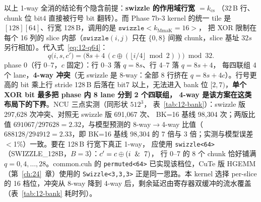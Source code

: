 以上 1-way 全消的结论有个隐含前提：\textbf{swizzle 的作用域行宽 $=k_{\mathrm{cs}}$}
（32\,B 行、chunk 位 bit4 直接被行号 bit 翻转）。而 Phase 7b-3 kernel 的统一 tile
是 $[128][64]$、行宽 128\,B，调用的是 $\texttt{swizzle}<k_{\mathrm{MmaK}}{=}16>$，
把 XOR 限制在每个 16 列的 slice 内部（$\texttt{swizzle}(i,j)$ 只在
$\{0,8\}$ 间搬 chunk，slice 基址 $32s$ 另行相加）。代入式~\ref{eq:12-q64}：
\begin{equation}
  q\bigl(i,s,c'\bigr) = \bigl(8s + 4\,(c\oplus(\lfloor i/4\rfloor\bmod2))\bigr)\bmod 32 .
\end{equation}
phase 0（行 0--7，$c$ 固定）：行 0--3 落 $q=8s$、行 4--7 落 $q=8s{+}4$，
每四联组 4 个 lane，\textbf{4-way 冲突}（无 swizzle 是 8-way：全部 8 行挤在
$q=8s+4c$）。行号更高的 bit 乘上行 stride 128\,B 后落在 bit7 以上，无法进入
bank 位 $[2,7)$，\textbf{单个 XOR bit 最多把 phase 内 8 lane 分到 2 个四联组，
4-way 是该方案在这类布局下的下界}。NCU 三点实测（同形状 $512^3$，
表~\ref{tab:12-bank}）：swizzle 版 297{,}628 次冲突、对照无 swizzle 版 691{,}067 次、
BK=16 基线 98{,}304 次；两版比值 $691067/297628=2.32$，与模型预测的
8-way$\to$4-way 比值（$688128/294912=2.33$，即 BK=16 基线 98{,}304 的 7 倍与
3 倍；实测与模型误差 $<$1\%）一致。要在 128\,B 行宽下真正 1-way，
应使用 \texttt{swizzle<64>}（SWIZZLE\_128B，$B{=}3$）：$c'=c\oplus(i\And7)$，
行 0--7 的 8 个 chunk 恰好铺满 $q=0,4,\dots,28$。common.cuh 的
\texttt{permuted\allowbreak{}<64>} 已实现该档位，CuTe 版 HGEMM（第~\ref{ch:24}~章）使用的
\texttt{Swizzle\allowbreak{}<3,\allowbreak{}3,\allowbreak{}3>} 正是同一思路。本 kernel 选择 per-slice 的
16 档位，冲突从 8-way 降到 4-way 后，剩余延迟由寄存器双缓冲的流水覆盖
（表~\ref{tab:12-bank} 耗时列）。

